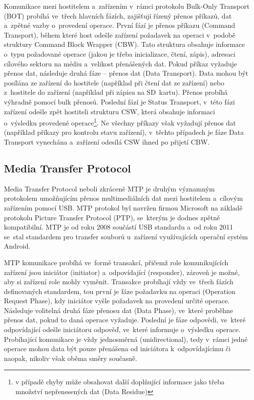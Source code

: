 Komunikace mezi hostitelem a~zařízením v~rámci protokolu Bulk-Only Transport (BOT) probíhá ve~třech hlavních fázích, zajišťují řízený přenos příkazů, dat a~zpětné vazby o~provedení operace. První fází je přenos příkazu (Command Transport), během které host odešle zařízení požadavek na operaci v~podobě struktury Command Block Wrapper (CBW). Tato struktura obsahuje informace o~typu požadované operace (jakou je třeba inicializace, čtení, zápis), adresaci cílového sektoru na médiu a~velikost přenášených dat. Pokud příkaz vyžaduje přenos dat, následuje druhá fáze -- přenos dat (Data Transport). Data mohou být posílána ze zařízení do hostitele (například při čtení dat ze zařízení) nebo z~hostitele do zařízení (například při zápisu na SD~kartu). Přenos probíhá výhradně pomocí bulk přenosů. Poslední fází je Status Transport, v~této fázi zařízení odešle zpět hostiteli strukturu CSW, která obsahuje informaci o~výsledku provedené operace\footnote{v případě chyby může obsahovat další doplňující informace jako třeba množství nepřenesených dat (Data Residue)}. Ne všechny příkazy však vyžadují přenos dat (například příkazy pro kontrolu stavu zařízení), v~těchto případech je fáze Data Transport vynechána a~zařízení odesílá CSW ihned po přijetí CBW.~\cite{silicon_labs_mass_storage_protocol}



\subsection{Media Transfer Protocol}
Media Transfer Protocol neboli zkráceně MTP je druhým významným protokolem umožňujícím přenos multimediálních dat mezi hostitelem a~cílovým zařízením pomocí USB. MTP protokol byl navržen firmou Microsoft na základě protokolu Picture Transfer Protocol (PTP), se~kterým je dodnes zpětně kompatibilní. MTP je od roku 2008 součástí USB standardu a~od roku 2011 se~stal standardem pro transfer souborů u~zařízení využívajících operační systém Android.~\cite{usb_standard_mtp, mtp_android}

MTP komunikace probíhá ve~formě transakcí, přičemž role komunikujících zařízení jsou iniciátor (initiator) a~odpovídající (responder), zároveň je možné, aby si zařízení role mohly vyměnit. Transakce probíhají vždy ve~třech fázích definovaných standardem, tou první je fáze požadavku na operaci (Operation Request Phase), kdy iniciátor vyšle požadavek na provedení určité operace. Následuje volitelná druhá fáze přenosu dat (Data Phase), ve~které proběhne přenos dat, pokud to daná operace vyžaduje. Poslední je fáze odpovědi, ve~které odpovídající odešle iniciátoru odpověď, ve~které informuje o~výsledku operace. Probíhající komunikace je vždy jednosměrná (unidirectional), tedy v~rámci jedné operace mohou data být pouze přenášena od iniciátora k~odpovídajícímu či naopak, nikoliv však oběma směry současně.~\cite{usb_standard_mtp}

